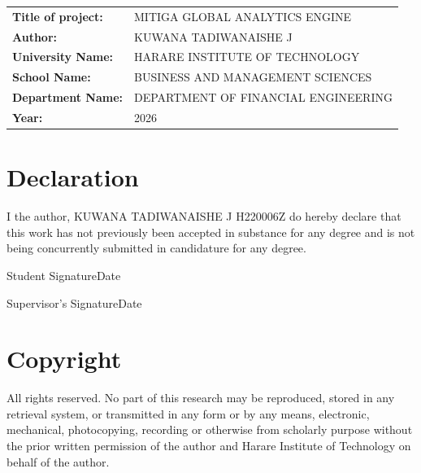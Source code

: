 \documentclass[12pt,a4paper]{article}
\begin{document}
\vspace{0.5cm}

\begin{tabular}{p{4.2cm} p{8cm}}
\textbf{Title of project:}   & MITIGA GLOBAL ANALYTICS ENGINE \\[0.9cm]
\textbf{Author:}              & KUWANA TADIWANAISHE J \\[0.9cm]
\textbf{University Name:}     & HARARE INSTITUTE OF TECHNOLOGY \\[0.9cm]
\textbf{School Name:}         & BUSINESS AND MANAGEMENT SCIENCES \\[0.9cm]
\textbf{Department Name:}     & DEPARTMENT OF FINANCIAL ENGINEERING \\[0.9cm]
\textbf{Year:}                & 2026 \\
\end{tabular}

\newpage

{}
\section*{Declaration}

I the author, KUWANA TADIWANAISHE J H220006Z do hereby declare that this work has not previously been accepted in substance for any degree and is not being concurrently submitted in candidature for any degree.

\vspace{2.5cm}

Student Signature\dotfill Date\dotfill

\vspace{2.5cm}

Supervisor's Signature\dotfill Date\dotfill

\newpage

{}
\section*{Copyright}

All rights reserved. No part of this research may be reproduced, stored in any retrieval system, or transmitted in any form or by any means, electronic, mechanical, photocopying, recording or otherwise from scholarly purpose without the prior written permission of the author and Harare Institute of Technology on behalf of the author.
\end{document}
